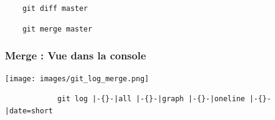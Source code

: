 \documentclass[table,tikz,12pt,svgnames]{beamer}
\begin{document}
\begin{frame}[fragile]

\begin{verbatim}
	git diff master
\end{verbatim}
\begin{verbatim}
	git merge master
\end{verbatim}


\pause
\end{frame}

\begin{frame}[fragile]
\frametitle{Merge : Vue dans la console}
\begin{adjustwidth}{-1cm}{-0.8cm}{}
	\begin{center}
		{\texttt{[image: images/git\_log\_merge.png]}}
		\begin{verbatim}
			git log |-{}-|all |-{}-|graph |-{}-|oneline |-{}-|date=short
		\end{verbatim}
	\end{center}
\end{adjustwidth}
\end{frame}
\end{document}
